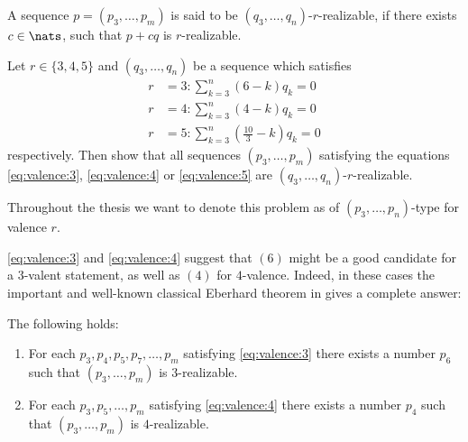 \begin{definition}\label{def:eberhard:realizable}
  A sequence $p = (p_3, \dots, p_m)$ is said to be $(q_3, \dots, q_n)$-$r$-realizable, if there exists $c \in \nats$, such that $p + c q$ is $r$-realizable.
\end{definition}
\begin{problem}\label{problem:eberhard}
  Let $r \in \{3, 4, 5\}$ and $(q_3, \dots, q_n)$ be a sequence which satisfies 
  \begin{align}
    r &= 3: \sum_{k=3}^n \left( 6            - k \right) q_k = 0 \label{eq:zero:curv:3}\\
    r &= 4: \sum_{k=3}^n \left( 4            - k \right) q_k = 0 \label{eq:zero:curv:4}\\
    r &= 5: \sum_{k=3}^n \left( \frac{10}{3} - k \right) q_k = 0 \label{eq:zero:curv:5}
  \end{align}
  respectively. Then show that all sequences $(p_3, \dots, p_m)$ satisfying the equations \ref{eq:valence:3}, \ref{eq:valence:4} or \ref{eq:valence:5} are $(q_3, \dots, q_n)$-$r$-realizable.
\end{problem}
\begin{notation}
  Throughout the thesis we want to denote this problem as of $(p_3, \dots, p_n)$-type for valence $r$.
\end{notation}
\autoref{eq:valence:3} and \autoref{eq:valence:4} suggest that $(6)$ might be a good candidate for a $3$-valent statement, as well as $(4)$ for $4$-valence. Indeed, in these cases the important and well-known classical Eberhard theorem in \cite{ConvexPolytopes} gives a complete answer:
\renewcommand{\Itemautorefname}{Theorem \ref{thm:eberhard}}
\begin{theorem} \label{thm:eberhard} The following holds:
  \begin{enumerate}[label=(\roman*)]
  \item \label{thm:eberhard:3} For each $p_3, p_4, p_5, p_7, \dots, p_m$ satisfying \autoref{eq:valence:3} there exists a number $p_6$ such that $(p_3, \dots, p_m)$ is $3$-realizable. 
  \item \label{thm:eberhard:4} For each $p_3, p_5, \dots, p_m$ satisfying \autoref{eq:valence:4} there exists a number $p_4$ such that $(p_3, \dots, p_m)$ is $4$-realizable. 
  \end{enumerate}
\end{theorem}

